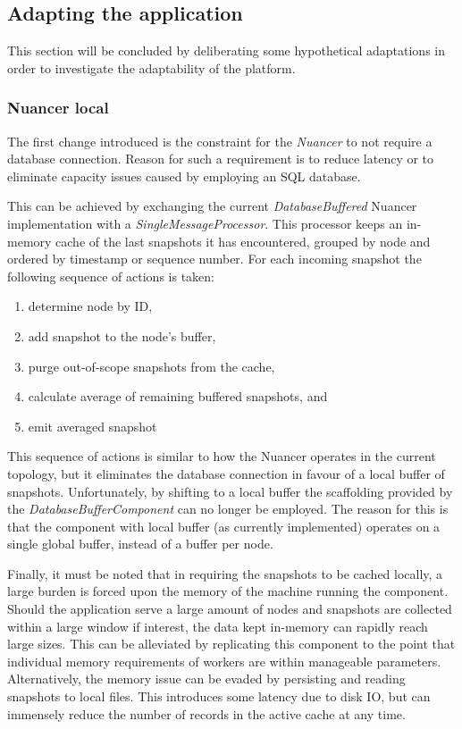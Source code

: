 \subsection{Adapting the application}
This section will be concluded by deliberating some hypothetical adaptations in order to investigate the adaptability of the platform.

\subsubsection{Nuancer local}
The first change introduced is the constraint for the \emph{Nuancer} to not require a database connection. Reason for such a requirement is to reduce latency or to eliminate capacity issues caused by employing an SQL database. 

This can be achieved by exchanging the current \emph{DatabaseBuffered} Nuancer implementation with a \emph{SingleMessageProcessor}. This processor keeps an in-memory cache of the last snapshots it has encountered, grouped by node and ordered by timestamp or sequence number. For each incoming snapshot the following sequence of actions is taken:
\begin{enumerate}
\nospace
\item determine node by ID,
\item add snapshot to the node's buffer,
\item purge out-of-scope snapshots from the cache,
\item calculate average of remaining buffered snapshots, and
\item emit averaged snapshot
\end{enumerate}
This sequence of actions is similar to how the Nuancer operates in the current topology, but it eliminates the database connection in favour of a local buffer of snapshots. Unfortunately, by shifting to a local buffer the scaffolding provided by the \emph{DatabaseBufferComponent} can no longer be employed. The reason for this is that the component with local buffer (as currently implemented) operates on a single global buffer, instead of a buffer per node.

Finally, it must be noted that in requiring the snapshots to be cached locally, a large burden is forced upon the memory of the machine running the component. Should the application serve a large amount of nodes and snapshots are collected within a large window if interest, the data kept in-memory can rapidly reach large sizes. This can be alleviated by replicating this component to the point that individual memory requirements of workers are within manageable parameters. Alternatively, the memory issue can be evaded by persisting and reading snapshots to local files. This introduces some latency due to disk IO, but can immensely reduce the number of records in the active cache at any time.


